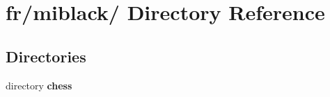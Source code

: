 \section{fr/miblack/ Directory Reference}
\label{dir_5ba8d999f2e019156f4dc7665a5c01b7}
\subsection*{Directories}
\begin{DoxyCompactItemize}
\item 
directory {\bf chess}
\end{DoxyCompactItemize}
